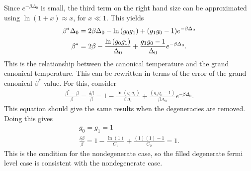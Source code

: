 Since $e^{-\beta\Delta_0}$ is small, the third term on the right hand size can be approximated using $\ln(1+x)\approx x$, for $x\ll1$. This yields
\begin{align}
    \beta^*\Delta_0&=2\beta\Delta_0-\ln\qty(g_0g_1)+(g_1g_0-1)e^{-\beta\Delta_0}\nonumber\\
    \beta^*&=2\beta-\frac{\ln\qty(g_0g_1)}{\Delta_0}+\frac{g_1g_0-1}{\Delta_0}e^{-\beta\Delta_0}.
\end{align} 
This is the relationship between the canonical temperature and the grand canonical temperature. This can be rewritten in terms of the error of the grand canonical $\beta^*$ value. For this, consider 
\begin{align}
    \frac{\beta^*-\beta}{\beta}=\frac{\delta\beta}{\beta}=1-\frac{\ln(g_0g_1)}{\beta\Delta_0}+\frac{(g_1g_0 - 1)}{\beta \Delta_0}e^{-\beta\Delta_0}. \label{filldegen}
\end{align}
This equation should give the same results when the degeneracies are removed. Doing this gives
\begin{gather}
    g_0=g_1=1\nonumber\\
    \frac{\delta\beta}{\beta}=1-\frac{\ln(1)}{C_1}+\frac{(1)(1)-1}{C_2}=1. \label{filldegencheck}
\end{gather}
This is the condition for the nondegenerate case, so the filled degenerate fermi level case is consistent with the nondegenerate case. 
